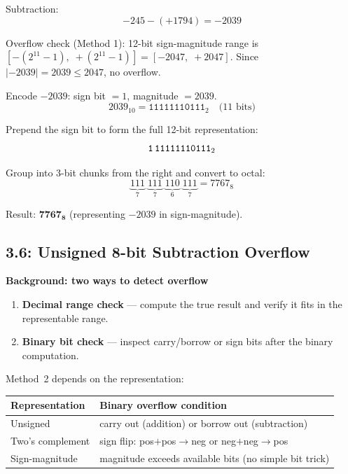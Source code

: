 Subtraction:
\[ -245 - (+1794) = -2039 \]

Overflow check (Method 1): 12-bit sign-magnitude range is $[-(2^{11}-1),\; +(2^{11}-1)] =
[-2047,\; +2047]$. Since $|-2039| = 2039 \le 2047$, no overflow.

Encode $-2039$: sign bit $= 1$, magnitude $= 2039$.
\[ 2039_{10} = \texttt{11111110111}_2 \quad\text{(11 bits)} \]

Prepend the sign bit to form the full 12-bit representation:
\[ \texttt{1\,11111110111}_2 \]

Group into 3-bit chunks from the right and convert to octal:
\[ \underbrace{111}_{7}\;\underbrace{111}_{7}\;\underbrace{110}_{6}\;\underbrace{111}_{7} = 7767_8 \]

Result: $\mathbf{7767_8}$ (representing $-2039$ in sign-magnitude).

\subsection*{3.6: Unsigned 8-bit Subtraction Overflow}
\hypertarget{sol-3.6}{}

\begin{flushright}
\begin{minipage}{0.92\linewidth}
\scriptsize
\textbf{Background: two ways to detect overflow}\par\smallskip
\begin{enumerate}
  \item \textbf{Decimal range check} --- compute the true result and verify
        it fits in the representable range.
  \item \textbf{Binary bit check} --- inspect carry/borrow or sign bits
        after the binary computation.
\end{enumerate}
\smallskip
Method~2 depends on the representation:

\smallskip
\begin{tabular}{@{}l l@{}}
\toprule
Representation & Binary overflow condition \\
\midrule
Unsigned & carry out (addition) or borrow out (subtraction) \\
Two's complement & sign flip: pos$+$pos$\to$neg or neg$+$neg$\to$pos \\
Sign-magnitude & magnitude exceeds available bits (no simple bit trick) \\
\bottomrule
\end{tabular}
\end{minipage}
\end{flushright}

